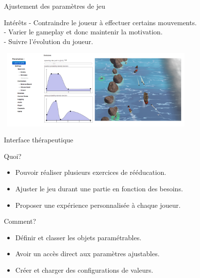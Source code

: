 \documentclass{beamer}
\begin{document}
		\begin{frame}{Ajustement des paramètres de jeu}
				\begin{block}{Intérêts}
					- Contraindre le joueur à effectuer certains mouvements.\\
					- Varier le gameplay et donc maintenir la motivation.\\
					- Suivre l'évolution du joueur.
				\end{block}
			\includegraphics[width=10cm, height=4cm]{../images/comparatif_interface_rochers.png}
		\end{frame}			
			
		\begin{frame}{Interface thérapeutique}
			\begin{block}{Quoi?}
				\begin{itemize}
					\item<1> Pouvoir réaliser plusieurs exercices de rééducation.
					\item<2> Ajuster le jeu durant une partie en fonction des besoins.
					\item<3> Proposer une expérience personnalisée à chaque joueur.
				\end{itemize}
			\end{block}
			\begin{block}{Comment?}
				\begin{itemize}
					\item<1> Définir et classer les objets paramétrables.
					\item<2> Avoir un accès direct aux paramètres ajustables.			
					\item<3> Créer et charger des configurations de valeurs.
				\end{itemize}
			\end{block}
		\end{frame}			
		
\end{document}
